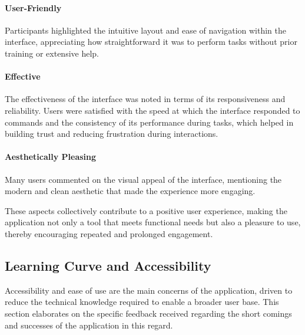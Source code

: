 \paragraph{User-Friendly} 
Participants highlighted the intuitive layout and ease of navigation within the interface, appreciating how straightforward it was to perform tasks without prior training or extensive help. 
\cite{P1, P2, P4, P5, P7, P8, P10}

 
\paragraph{Effective} 
The effectiveness of the interface was noted in terms of its responsiveness and reliability. 
Users were satisfied with the speed at which the interface responded to commands and the consistency of its performance during tasks, which helped in building trust and reducing frustration during interactions.
\cite{P2, P4, P7, P8, P10}



\paragraph{Aesthetically Pleasing} 
Many users commented on the visual appeal of the interface, mentioning the modern and clean aesthetic that made the experience more engaging. 
\cite{P7, P8, P10}


These aspects collectively contribute to a positive user experience, making the application not only a tool that meets functional needs but also a pleasure to use, thereby encouraging repeated and prolonged engagement.

\subsection*{Learning Curve and Accessibility}
\label{sec:results:learning_curve_accessibility}

Accessibility and ease of use are the main concerns of the application, driven to reduce the technical knowledge required to enable a broader user base.
This section elaborates on the specific feedback received regarding the short comings and successes of the application in this regard.

